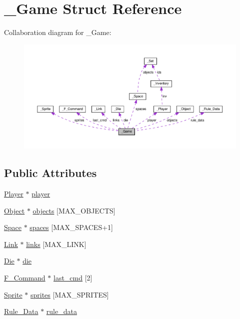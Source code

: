 \hypertarget{struct__Game}{}\section{\+\_\+\+Game Struct Reference}
\label{struct__Game}


Collaboration diagram for \+\_\+\+Game\+:\nopagebreak
\begin{figure}[H]
\begin{center}
\leavevmode
\includegraphics[width=350pt]{struct__Game__coll__graph}
\end{center}
\end{figure}
\subsection*{Public Attributes}
\begin{DoxyCompactItemize}
\item 
\hyperlink{struct__Player}{Player} $\ast$ \hyperlink{struct__Game_a31406605782d71ec00c4bf258ea76267}{player}
\item 
\hyperlink{struct__Object}{Object} $\ast$ \hyperlink{struct__Game_ad45bf5645a26e546d0060a2e61f9cf81}{objects} \mbox{[}M\+A\+X\+\_\+\+O\+B\+J\+E\+C\+TS\mbox{]}
\item 
\hyperlink{struct__Space}{Space} $\ast$ \hyperlink{struct__Game_ab4180417d9148f8abb2233ca6c4ecfe5}{spaces} \mbox{[}M\+A\+X\+\_\+\+S\+P\+A\+C\+ES+1\mbox{]}
\item 
\hyperlink{struct__Link}{Link} $\ast$ \hyperlink{struct__Game_aa4ff88aaf2a54616e5863609effad94e}{links} \mbox{[}M\+A\+X\+\_\+\+L\+I\+NK\mbox{]}
\item 
\hyperlink{die_8h_a892f0b0bf81d69a1f7a14ea238e36dd3}{Die} $\ast$ \hyperlink{struct__Game_a0d6009b5dcb080489c192a9198fa7d46}{die}
\item 
\hyperlink{struct__F__Command}{F\+\_\+\+Command} $\ast$ \hyperlink{struct__Game_a60dec64e55c5cf61b0711a11a62d18c2}{last\+\_\+cmd} \mbox{[}2\mbox{]}
\item 
\hyperlink{struct__Sprite}{Sprite} $\ast$ \hyperlink{struct__Game_a457e4328c3dfd137ba4407ad8e041cf2}{sprites} \mbox{[}M\+A\+X\+\_\+\+S\+P\+R\+I\+T\+ES\mbox{]}
\item 
\hyperlink{struct__Rule__Data}{Rule\+\_\+\+Data} $\ast$ \hyperlink{struct__Game_a2e88124c71d697f962654f2518a62109}{rule\+\_\+data}
\end{DoxyCompactItemize}


